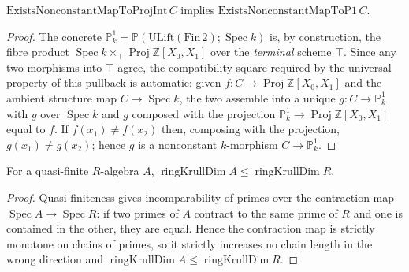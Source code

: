 \begin{proposition}
  \label{lem:adelic_nonconstant_projint_bridge}
  \leanok
  \(\mathrm{ExistsNonconstantMapToProjInt}\, C\) implies
  \(\mathrm{ExistsNonconstantMapToP1}\, C\).
\end{proposition}
\begin{proof}
  \leanok
  The concrete \(\mathbb{P}^1_k = \mathbb{P}(\mathrm{ULift}(\mathrm{Fin}\,
  2); \operatorname{Spec} k)\) is, by construction, the fibre product
  \(\operatorname{Spec} k \times_{\top} \operatorname{Proj}
  \mathbb{Z}[X_0, X_1]\) over the \emph{terminal} scheme \(\top\). Since
  any two morphisms into \(\top\) agree, the compatibility square
  required by the universal property of this pullback is automatic:
  given \(f \colon C \to \operatorname{Proj} \mathbb{Z}[X_0, X_1]\) and
  the ambient structure map \(C \to \operatorname{Spec} k\), the two
  assemble into a unique \(g \colon C \to \mathbb{P}^1_k\) with
  \(g\) over \(\operatorname{Spec} k\) and \(g\) composed with the
  projection \(\mathbb{P}^1_k \to \operatorname{Proj} \mathbb{Z}[X_0,
  X_1]\) equal to \(f\). If \(f(x_1) \ne f(x_2)\) then, composing with
  the projection, \(g(x_1) \ne g(x_2)\); hence \(g\) is a nonconstant
  \(k\)-morphism \(C \to \mathbb{P}^1_k\).
\end{proof}

\begin{lemma}
  \label{lem:adelic_quasiFinite_dim_le}
  \leanok
  For a quasi-finite \(R\)-algebra \(A\), \(\operatorname{ringKrullDim}
  A \le \operatorname{ringKrullDim} R\).
\end{lemma}
\begin{proof}
  \leanok
  Quasi-finiteness gives incomparability of primes over the contraction
  map \(\operatorname{Spec} A \to \operatorname{Spec} R\): if two primes
  of \(A\) contract to the same prime of \(R\) and one is contained in
  the other, they are equal. Hence the contraction map is strictly
  monotone on chains of primes, so it strictly increases no chain
  length in the wrong direction and \(\operatorname{ringKrullDim} A \le
  \operatorname{ringKrullDim} R\).
\end{proof}

